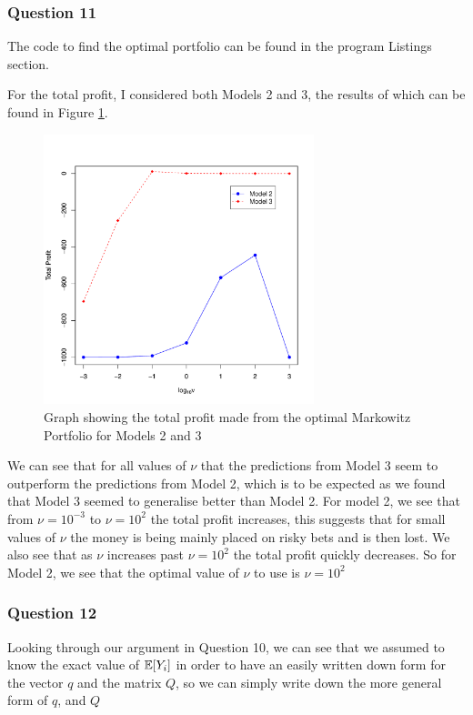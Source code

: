 \documentclass[11pt]{article} %
\let\originalleft\left
\let\originalright\right
\renewcommand{\left}{\mathopen{}\mathclose\bgroup\originalleft}
\renewcommand{\right}{\aftergroup\egroup\originalright}
\begin{document}
\subsubsection*{Question 11}

The code to find the optimal portfolio can be found in the program Listings section.

For the total profit, I considered both Models 2 and 3, the results of which can be found in Figure \ref{fig:markowitz_portfolio}.

\begin{figure}[h]
	\centering
	\includegraphics[width=0.7\textwidth]{"../R File/markowitz_portfolio"}
	\caption{Graph showing the total profit made from the optimal Markowitz Portfolio for Models 2 and 3}
	\label{fig:markowitz_portfolio}
\end{figure}

We can see that for all values of $\nu$ that the predictions from Model 3 seem to outperform the predictions from Model 2, which is to be expected as we found that Model 3 seemed to generalise better than Model 2. For model 2, we see that from $\nu = 10^{-3}$ to $\nu = 10^2$ the total profit increases, this suggests that for small values of $\nu$ the money is being mainly placed on risky bets and is then lost. We also see that as $\nu$ increases past $\nu=10^2$ the total profit quickly decreases. So for Model 2, we see that the optimal value of $\nu$ to use is $\nu = 10^2$

\subsubsection*{Question 12}
Looking through our argument in Question 10, we can see that we assumed to know the exact value of $\mathbb{E}\left[Y_i\right]$ in order to have an easily written down form for the vector $q$ and the matrix $Q$, so we can simply write down the more general form of $q$, and $Q$
\end{document}
